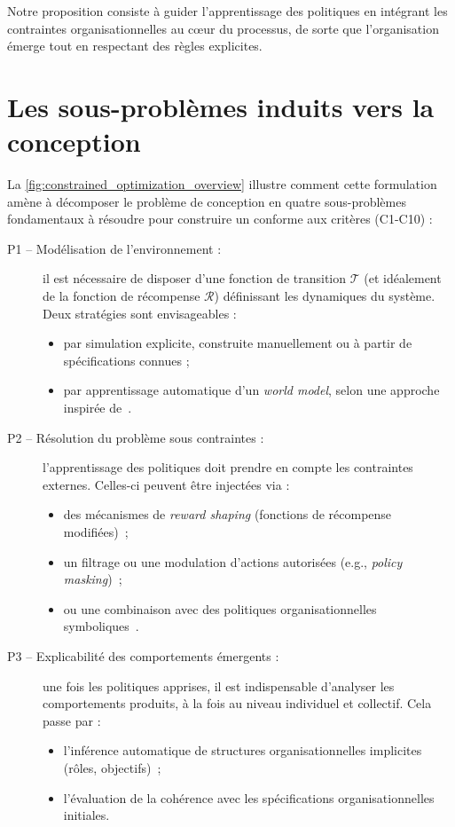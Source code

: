 Notre proposition consiste à guider l'apprentissage des politiques en intégrant les contraintes organisationnelles au cœur du processus, de sorte que l'organisation émerge tout en respectant des règles explicites.


\section{Les sous-problèmes induits vers la conception}

La \autoref{fig:constrained_optimization_overview} illustre comment cette formulation amène à décomposer le problème de conception en quatre sous-problèmes fondamentaux à résoudre pour construire un  conforme aux critères (C1-C10) :

\begin{description}
    \item[P1 -- Modélisation de l'environnement :] il est nécessaire de disposer d'une fonction de transition \(\mathcal{T}\) (et idéalement de la fonction de récompense \(\mathcal{R}\)) définissant les dynamiques du système. Deux stratégies sont envisageables :
        \begin{itemize}
            \item par simulation explicite, construite manuellement ou à partir de spécifications connues ;
            \item par apprentissage automatique d'un \textit{world model}, selon une approche inspirée de~\cite{Ha2018}.
        \end{itemize}

    \item[P2 -- Résolution du problème  sous contraintes :] l'apprentissage des politiques doit prendre en compte les contraintes externes. Celles-ci peuvent être injectées via :
        \begin{itemize}
            \item des mécanismes de \textit{reward shaping} (fonctions de récompense modifiées)~\cite{Ng1999};
            \item un filtrage ou une modulation d'actions autorisées (e.g., \textit{policy masking})~\cite{ElsayedAly2021};
            \item ou une combinaison avec des politiques organisationnelles symboliques~\cite{Boella2006,Hubner2004}.
        \end{itemize}

    \item[P3 -- Explicabilité des comportements émergents :] une fois les politiques apprises, il est indispensable d'analyser les comportements produits, à la fois au niveau individuel et collectif. Cela passe par :
        \begin{itemize}
            \item l'inférence automatique de structures organisationnelles implicites (rôles, objectifs)~\cite{Rahwan2003};
            \item l'évaluation de la cohérence avec les spécifications organisationnelles initiales.
        \end{itemize}


\end{description}
